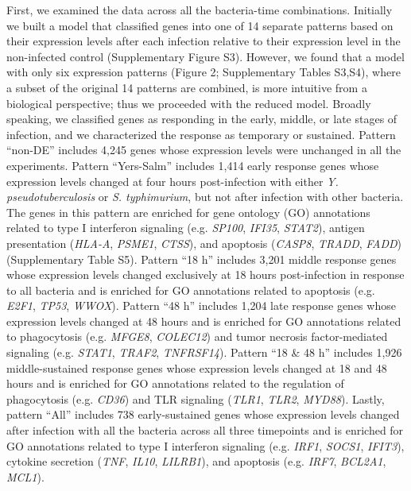 First, we examined the data across all the bacteria-time combinations.
Initially we built a model that classified genes into one of 14 separate
patterns based on their expression levels after each infection relative
to their expression level in the non-infected control (Supplementary
Figure S3). However, we found that a model with only six expression
patterns (Figure 2; Supplementary Tables S3,S4), where a subset of the
original 14 patterns are combined, is more intuitive from a biological
perspective; thus we proceeded with the reduced model. Broadly speaking,
we classified genes as responding in the early, middle, or late stages
of infection, and we characterized the response as temporary or
sustained. Pattern ``non-DE'' includes 4,245 genes whose expression
levels were unchanged in all the experiments. Pattern ``Yers-Salm''
includes 1,414 early response genes whose expression levels changed at
four hours post-infection with either \emph{Y. pseudotuberculosis} or
\emph{S. typhimurium}, but not after infection with other bacteria. The
genes in this pattern are enriched for gene ontology (GO) annotations
related to type I interferon signaling (e.g. \emph{SP100}, \emph{IFI35},
\emph{STAT2}), antigen presentation (\emph{HLA-A}, \emph{PSME1},
\emph{CTSS}), and apoptosis (\emph{CASP8}, \emph{TRADD}, \emph{FADD})
(Supplementary Table S5). Pattern ``18 h'' includes 3,201 middle
response genes whose expression levels changed exclusively at 18 hours
post-infection in response to all bacteria and is enriched for GO
annotations related to apoptosis (e.g. \emph{E2F1}, \emph{TP53},
\emph{WWOX}). Pattern ``48 h'' includes 1,204 late response genes whose
expression levels changed at 48 hours and is enriched for GO annotations
related to phagocytosis (e.g. \emph{MFGE8}, \emph{COLEC12}) and tumor
necrosis factor-mediated signaling (e.g. \emph{STAT1}, \emph{TRAF2},
\emph{TNFRSF14}). Pattern ``18 \& 48 h'' includes 1,926 middle-sustained
response genes whose expression levels changed at 18 and 48 hours and is
enriched for GO annotations related to the regulation of phagocytosis
(e.g. \emph{CD36}) and TLR signaling (\emph{TLR1}, \emph{TLR2},
\emph{MYD88}). Lastly, pattern ``All'' includes 738 early-sustained
genes whose expression levels changed after infection with all the
bacteria across all three timepoints and is enriched for GO annotations
related to type I interferon signaling (e.g. \emph{IRF1}, \emph{SOCS1},
\emph{IFIT3}), cytokine secretion (\emph{TNF}, \emph{IL10},
\emph{LILRB1}), and apoptosis (e.g. \emph{IRF7}, \emph{BCL2A1},
\emph{MCL1}).

